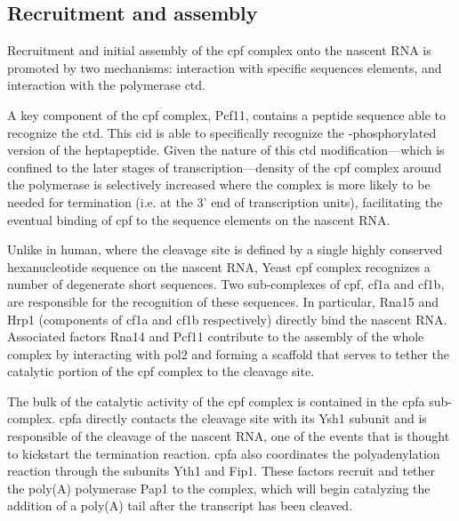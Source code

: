 


\subsection{Recruitment and assembly}
Recruitment and initial assembly of the \gls{cpf} complex onto the nascent RNA is promoted by two mechanisms: interaction with specific sequences elements, and interaction with the polymerase \gls{ctd}.

A key component of the \gls{cpf} complex, Pcf11, contains a peptide sequence able to recognize the \gls{ctd}. This \gls{cid} is able to specifically recognize the \sert{}-phosphorylated version of the heptapeptide.
Given the nature of this \gls{ctd} modification---which is confined to the later stages of transcription---density of the \gls{cpf} complex around the polymerase is selectively increased where the complex is more likely to be needed for termination (i.e. at the 3' end of transcription units), facilitating the eventual binding of \gls{cpf} to the sequence elements on the nascent RNA.

Unlike in human, where the cleavage site is defined by a single highly conserved hexanucleotide sequence on the nascent RNA, Yeast \gls{cpf} complex recognizes a number of degenerate short sequences.
Two sub-complexes of \gls{cpf}, \gls{cf1a} and \gls{cf1b}, are responsible for the recognition of these sequences.
In particular, Rna15 and Hrp1 (components of \gls{cf1a} and \gls{cf1b} respectively) directly bind the nascent RNA.
Associated factors Rna14 and Pcf11 contribute to the assembly of the whole complex by interacting with \gls{pol2} and forming a scaffold that serves to tether the catalytic portion of the \gls{cpf} complex to the cleavage site.

The bulk of the catalytic activity of the \gls{cpf} complex is contained in the \gls{cpfa} sub-complex.
\gls{cpfa} directly contacts the cleavage site with its Ysh1 subunit and is responsible of the cleavage of the nascent RNA, one of the events that is thought to kickstart the termination reaction.
\gls{cpfa} also coordinates the polyadenylation reaction through the subunits Yth1 and Fip1. 
These factors recruit and tether the poly(A) polymerase Pap1 to the complex, which will begin catalyzing the addition of a poly(A) tail after the transcript has been cleaved.

